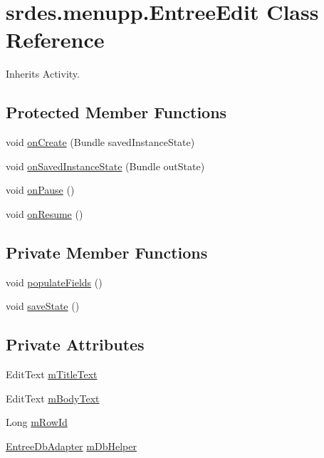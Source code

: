 \hypertarget{classsrdes_1_1menupp_1_1_entree_edit}{\section{srdes.\-menupp.\-Entree\-Edit \-Class \-Reference}
\label{classsrdes_1_1menupp_1_1_entree_edit}
}


\-Inherits \-Activity.

\subsection*{\-Protected \-Member \-Functions}
\begin{DoxyCompactItemize}
\item 
void \hyperlink{classsrdes_1_1menupp_1_1_entree_edit_a92e7c15f4956fc6173a22059c654ee75}{on\-Create} (\-Bundle saved\-Instance\-State)
\item 
void \hyperlink{classsrdes_1_1menupp_1_1_entree_edit_a5df7c4f8bbda5fdbcbb2e59d20c92dfe}{on\-Saved\-Instance\-State} (\-Bundle out\-State)
\item 
void \hyperlink{classsrdes_1_1menupp_1_1_entree_edit_a492da33c61d244ef43c891c9ed472bf1}{on\-Pause} ()
\item 
void \hyperlink{classsrdes_1_1menupp_1_1_entree_edit_ac78a7c5e1836c2199190b8dee56e3f9b}{on\-Resume} ()
\end{DoxyCompactItemize}
\subsection*{\-Private \-Member \-Functions}
\begin{DoxyCompactItemize}
\item 
void \hyperlink{classsrdes_1_1menupp_1_1_entree_edit_a82af8f34cb73ba7dbff7837923494542}{populate\-Fields} ()
\item 
void \hyperlink{classsrdes_1_1menupp_1_1_entree_edit_a92fb438420c863b3ac5ab8e7daf0ff47}{save\-State} ()
\end{DoxyCompactItemize}
\subsection*{\-Private \-Attributes}
\begin{DoxyCompactItemize}
\item 
\-Edit\-Text \hyperlink{classsrdes_1_1menupp_1_1_entree_edit_adcbb5bc937580270638ebfda4265cd11}{m\-Title\-Text}
\item 
\-Edit\-Text \hyperlink{classsrdes_1_1menupp_1_1_entree_edit_abcacd374ad79526bef01bccd36c3f5db}{m\-Body\-Text}
\item 
\-Long \hyperlink{classsrdes_1_1menupp_1_1_entree_edit_a2cce72da055bbe09877d4575008c70a2}{m\-Row\-Id}
\item 
\hyperlink{classsrdes_1_1menupp_1_1_entree_db_adapter}{\-Entree\-Db\-Adapter} \hyperlink{classsrdes_1_1menupp_1_1_entree_edit_a8991a77418ad85b136dcb2f36c904eb2}{m\-Db\-Helper}
\end{DoxyCompactItemize}


